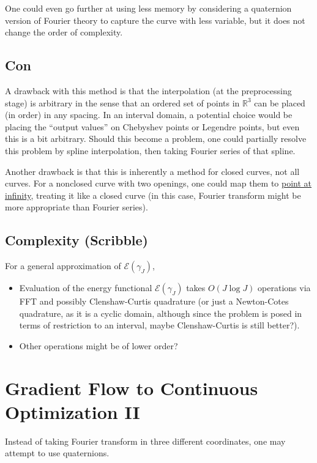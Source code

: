 \documentclass[a4paper]{article}
\theoremstyle{definition}
\begin{document}
One could even go further at using less memory by considering a quaternion version of Fourier theory to capture the curve with less variable, but it does not change the order of complexity.

\subsection{Con}
A drawback with this method is that the interpolation (at the preprocessing stage) is arbitrary in the sense that an ordered set of points in $\mathbb{R}^3$ can be placed (in order) in any spacing.
In an interval domain, a potential choice would be placing the ``output values'' on Chebyshev points or Legendre points, but even this is a bit arbitrary.
Should this become a problem, one could partially resolve this problem by spline interpolation, then taking Fourier series of that spline.

Another drawback is that this is inherently a method for closed curves, not all curves. For a nonclosed curve with two openings, one could map them to \underline{point at infinity}, treating it like a closed curve (in this case, Fourier transform might be more appropriate than Fourier series).


\subsection{Complexity (Scribble)}
For a general approximation of $\mathcal{E}\left( \gamma_J \right)$,
\begin{itemize}
    \item Evaluation of the energy functional $\mathcal{E} \left( \gamma_J \right)$ takes $O\left( J \log J \right)$ operations via FFT and possibly Clenshaw-Curtis quadrature (or just a Newton-Cotes quadrature, as it is a cyclic domain, although since the problem is posed in terms of restriction to an interval, maybe Clenshaw-Curtis is still better?).
    \item Other operations might be of lower order? 
\end{itemize}

\section{Gradient Flow to Continuous Optimization II}
Instead of taking Fourier transform in three different coordinates, one may attempt to use quaternions.
\end{document}
